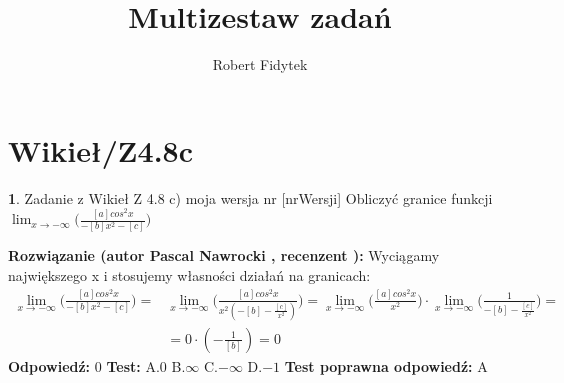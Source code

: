 \documentclass[12pt, a4paper]{article}
\title{Multizestaw zadań}
\author{Robert Fidytek}
\date{}
\theoremstyle{definition} %
\newtheorem{zad}{}
\newcommand{\kategoria}[1]{\section{#1}} %
\newcommand{\zadStart}[1]{\begin{zad}#1\newline} %
\newcommand{\zadStop}{\end{zad}}   %
\newcommand{\rozwStart}[2]{\noindent \textbf{Rozwiązanie (autor #1 , recenzent #2): }\newline} %
\newcommand{\rozwStop}{\newline}                                            %
\newcommand{\odpStart}{\noindent \textbf{Odpowiedź:}\newline}    %
\newcommand{\odpStop}{\newline}                                             %
\newcommand{\testStart}{\noindent \textbf{Test:}\newline} %
\newcommand{\testStop}{\newline} %
\newcommand{\kluczStart}{\noindent \textbf{Test poprawna odpowiedź:}\newline} %
\newcommand{\kluczStop}{\newline} %
\begin{document}
\maketitle


\kategoria{Wikieł/Z4.8c}
\zadStart{Zadanie z Wikieł Z 4.8 c) moja wersja nr [nrWersji]}
Obliczyć granice funkcji $\displaystyle{\lim_{x \to -\infty}}\bigg(\frac{[a]cos^2x}{-[b]x^2-[c]}\bigg)$
\zadStop
\rozwStart{Pascal Nawrocki}{}
Wyciągamy największego x i stosujemy własności działań na granicach:
\begin{equation}
\begin{split}
\displaystyle{\lim_{x \to -\infty}}\bigg(\frac{[a]cos^2x}{-[b]x^2-[c]}\bigg)=&\displaystyle{\lim_{x \to -\infty}}\bigg(\frac{[a]cos^2x}{x^2(-[b]-\frac{[c]}{x^2})}\bigg)=\displaystyle{\lim_{x \to -\infty}}\bigg(\frac{[a]cos^2x}{x^2}\bigg)\cdot\displaystyle{\lim_{x \to -\infty}}\bigg(\frac{1}{-[b]-\frac{[c]}{x^2}}\bigg)=\\&=0\cdot(-\frac{1}{[b]})=0
\end{split}
\end{equation}
\rozwStop
\odpStart
$0$
\odpStop
\testStart
A.$0$
B.$\infty$
C.$-\infty$
D.$-1$
\testStop
\kluczStart
A
\kluczStop
\end{document}
